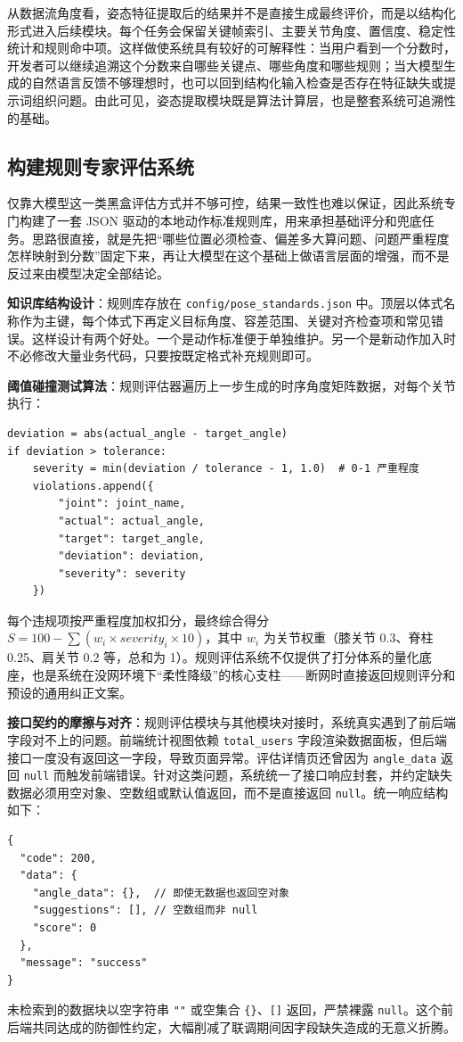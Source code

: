 从数据流角度看，姿态特征提取后的结果并不是直接生成最终评价，而是以结构化形式进入后续模块。每个任务会保留关键帧索引、主要关节角度、置信度、稳定性统计和规则命中项。这样做使系统具有较好的可解释性：当用户看到一个分数时，开发者可以继续追溯这个分数来自哪些关键点、哪些角度和哪些规则；当大模型生成的自然语言反馈不够理想时，也可以回到结构化输入检查是否存在特征缺失或提示词组织问题。由此可见，姿态提取模块既是算法计算层，也是整套系统可追溯性的基础。

\subsection{构建规则专家评估系统}
仅靠大模型这一类黑盒评估方式并不够可控，结果一致性也难以保证，因此系统专门构建了一套 JSON 驱动的本地动作标准规则库，用来承担基础评分和兜底任务。思路很直接，就是先把“哪些位置必须检查、偏差多大算问题、问题严重程度怎样映射到分数”固定下来，再让大模型在这个基础上做语言层面的增强，而不是反过来由模型决定全部结论。

\textbf{知识库结构设计}：规则库存放在 \texttt{config/pose\_standards.json} 中。顶层以体式名称作为主键，每个体式下再定义目标角度、容差范围、关键对齐检查项和常见错误。这样设计有两个好处。一个是动作标准便于单独维护。另一个是新动作加入时不必修改大量业务代码，只要按既定格式补充规则即可。

\textbf{阈值碰撞测试算法}：规则评估器遍历上一步生成的时序角度矩阵数据，对每个关节执行：
\begin{verbatim}
deviation = abs(actual_angle - target_angle)
if deviation > tolerance:
    severity = min(deviation / tolerance - 1, 1.0)  # 0-1 严重程度
    violations.append({
        "joint": joint_name,
        "actual": actual_angle,
        "target": target_angle,
        "deviation": deviation,
        "severity": severity
    })
\end{verbatim}
每个违规项按严重程度加权扣分，最终综合得分 $S = 100 - \sum (w_i \times severity_i \times 10)$，其中 $w_i$ 为关节权重（膝关节 0.3、脊柱 0.25、肩关节 0.2 等，总和为 1）。规则评估系统不仅提供了打分体系的量化底座，也是系统在没网环境下“柔性降级”的核心支柱——断网时直接返回规则评分和预设的通用纠正文案。

\textbf{接口契约的摩擦与对齐}：规则评估模块与其他模块对接时，系统真实遇到了前后端字段对不上的问题。前端统计视图依赖 \texttt{total\_users} 字段渲染数据面板，但后端接口一度没有返回这一字段，导致页面异常。评估详情页还曾因为 \texttt{angle\_data} 返回 \texttt{null} 而触发前端错误。针对这类问题，系统统一了接口响应封套，并约定缺失数据必须用空对象、空数组或默认值返回，而不是直接返回 \texttt{null}。统一响应结构如下：
\begin{verbatim}
{
  "code": 200,
  "data": {
    "angle_data": {},  // 即使无数据也返回空对象
    "suggestions": [], // 空数组而非 null
    "score": 0
  },
  "message": "success"
}
\end{verbatim}
未检索到的数据块以空字符串 \texttt{""} 或空集合 \texttt{\{\}}、\texttt{[]} 返回，严禁裸露 \texttt{null}。这个前后端共同达成的防御性约定，大幅削减了联调期间因字段缺失造成的无意义折腾。

